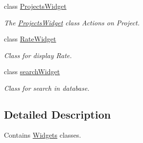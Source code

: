 \begin{DoxyCompactItemize}
class \hyperlink{classGui_1_1Widgets_1_1ProjectsWidget}{Projects\-Widget}
\begin{DoxyCompactList}\small\item\em The \hyperlink{classGui_1_1Widgets_1_1ProjectsWidget}{Projects\-Widget} class Actions on Project. \end{DoxyCompactList}\item 
class \hyperlink{classGui_1_1Widgets_1_1RateWidget}{Rate\-Widget}
\begin{DoxyCompactList}\small\item\em Class for display Rate. \end{DoxyCompactList}\item 
class \hyperlink{classGui_1_1Widgets_1_1searchWidget}{search\-Widget}
\begin{DoxyCompactList}\small\item\em Class for search in database. \end{DoxyCompactList}\end{DoxyCompactItemize}


\subsection{Detailed Description}
Contains \hyperlink{namespaceGui_1_1Widgets}{Widgets} classes. 